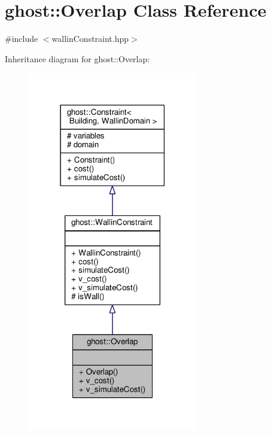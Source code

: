 \hypertarget{classghost_1_1Overlap}{\section{ghost\-:\-:Overlap Class Reference}
\label{classghost_1_1Overlap}
}


{\ttfamily \#include $<$wallin\-Constraint.\-hpp$>$}



Inheritance diagram for ghost\-:\-:Overlap\-:\nopagebreak
\begin{figure}[H]
\begin{center}
\leavevmode
\includegraphics[width=210pt]{classghost_1_1Overlap__inherit__graph}
\end{center}
\end{figure}


